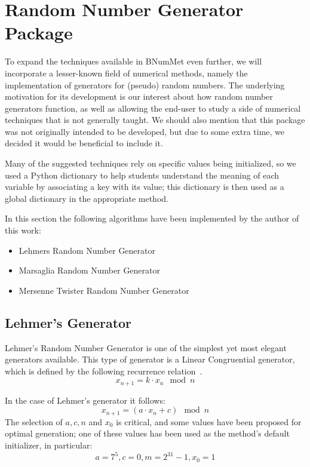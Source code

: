\section{Random Number Generator Package}
To expand the techniques available in BNumMet even further, we will incorporate a lesser-known field of numerical methods, namely the implementation of generators for (pseudo) random numbers. The underlying motivation for its development is our interest about how random number generators function, as well as allowing the end-user to study a side of numerical techniques that is not generally taught. We should also mention that this package was not originally intended to be developed, but due to some extra time, we decided it would be beneficial to include it.

Many of the suggested techniques rely on specific values being initialized, so we used a Python dictionary to help students understand the meaning of each variable by associating a key with its value; this dictionary is then used as a global dictionary in the appropriate method.

In this section the following algorithms have been implemented by the author of this work:
\begin{itemize}
    \item Lehmers Random Number Generator 
    \item Marsaglia Random Number Generator 
    \item Mersenne Twister Random Number Generator 
\end{itemize}

\subsection{Lehmer's Generator}
Lehmer's Random Number Generator is one of the simplest yet most elegant generators available. This type of generator is a Linear Congruential generator, which is defined by the following recurrence relation~\cite{payne1969coding,park1988random}.
\[x_{n+1} = k\cdot x_n \mod{n}\]

In the case of Lehmer's generator it follows:
\[x_{n+1} = (a\cdot x_n+c) \mod{n}\]
The selection of $a,c,n$ and $x_0$ is critical, and some values have been proposed for optimal generation; one of these values has been used as the method's default initializer, in particular:
\[a= 7^5, c=0, m=2^{31}-1, x_0 = 1 \]

